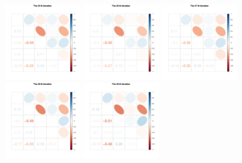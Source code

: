 \begin{figure}[h]\ContinuedFloat
\centering
\includegraphics[width=0.3\textwidth,height=0.2\textheight]{Chapters/05MCMCOU/plots/paraEvolution/corMatrix25.pdf}
\includegraphics[width=0.3\textwidth,height=0.2\textheight]{Chapters/05MCMCOU/plots/paraEvolution/corMatrix26.pdf}
\includegraphics[width=0.3\textwidth,height=0.2\textheight]{Chapters/05MCMCOU/plots/paraEvolution/corMatrix27.pdf}
\includegraphics[width=0.3\textwidth,height=0.2\textheight]{Chapters/05MCMCOU/plots/paraEvolution/corMatrix28.pdf}
\includegraphics[width=0.3\textwidth,height=0.2\textheight]{Chapters/05MCMCOU/plots/paraEvolution/corMatrix29.pdf}

\end{figure}
